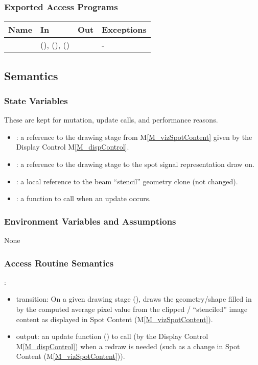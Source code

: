 \documentclass[12pt, titlepage]{article}
\newcommand{\mref}[1]{M\ref{#1}}
\newcommand{\mrefp}[1]{(\mref{#1})}
\begin{document}
\subsubsection{Exported Access Programs}

\begin{center}
\begin{tabular}{L{5cm} L{4cm} L{4cm} L{2cm}}
\hline
\textbf{Name} & \textbf{In} & \textbf{Out} & \textbf{Exceptions} \\
\hline
{} &
   (),  (),
   ()
  &  & - \\
\hline
\end{tabular}
\end{center}

\subsection{Semantics}

\subsubsection{State Variables}
These are kept for mutation, update calls, and performance reasons.
\begin{itemize}
  \item {}: a reference to the drawing stage from \mref{M_vizSpotContent}
    given by the Display Control \mref{M_dispControl}.
  \item {}: a reference to the drawing stage to the spot signal
    representation draw on.
  \item {}: a local reference to the beam ``stencil'' geometry clone (not changed).
  \item {}: a function to call when an update occurs.
\end{itemize}

\subsubsection{Environment Variables and Assumptions}
None

\subsubsection{Access Routine Semantics}

\noindent {}:
\begin{itemize}
  \item transition: On a given drawing stage (),
  draws the  geometry/shape filled in by the computed average pixel value
  from the clipped / ``stenciled'' image content as displayed in
  Spot Content \mrefp{M_vizSpotContent}.
\item output: an update function ()
  to call (by the Display Control \mref{M_dispControl})
  when a redraw is needed (such as a change in Spot Content \mrefp{M_vizSpotContent}).
\end{itemize}
\end{document}
